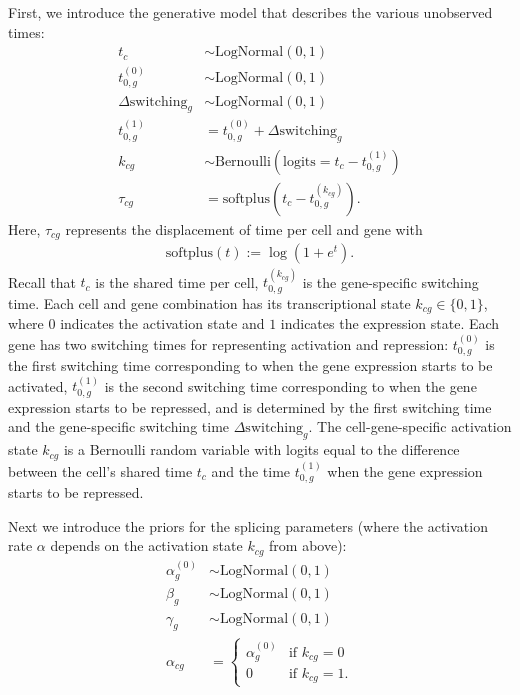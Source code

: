 \documentclass[
  sn-mathphys-num,
  lineno,
  twocolumn]{sn-jnl}
\begin{document}
First, we introduce the generative model that describes the various
unobserved times: \begin{align}
  t_c &\sim \text{LogNormal}(0, 1) \\
  t^{(0)}_{0,g} &\sim \text{LogNormal}(0, 1) \\
  \Delta \textrm{switching}_g &\sim \text{LogNormal}(0, 1) \\
  t^{(1)}_{0,g} &= t^{(0)}_{0,g} + \Delta \textrm{switching}_g \\
  k_{cg} &\sim \text{Bernoulli}(\textrm{logits}=t_c - t^{(1)}_{0,g}) \\
  \tau_{cg} &= \text{softplus}(t_c - t^{(k_{cg})}_{0,g}).
\end{align} Here, \(\tau_{cg}\) represents the displacement of time per
cell and gene with \begin{align}
 \text{softplus}(t) :=  \log( 1 + e^t).
\end{align} Recall that \(t_c\) is the shared time per cell,
\(t^{(k_{cg})}_{0,g}\) is the gene-specific switching time. Each cell
and gene combination has its transcriptional state
\(k_{cg} \in \{ 0, 1 \}\), where \(0\) indicates the activation state
and \(1\) indicates the expression state. Each gene has two switching
times for representing activation and repression: \(t^{(0)}_{0,g}\) is
the first switching time corresponding to when the gene expression
starts to be activated, \(t^{(1)}_{0,g}\) is the second switching time
corresponding to when the gene expression starts to be repressed, and is
determined by the first switching time and the gene-specific switching
time \(\Delta \text{switching}_g\). The cell-gene-specific activation
state \(k_{cg}\) is a Bernoulli random variable with logits equal to the
difference between the cell's shared time \(t_c\) and the time
\(t^{(1)}_{0,g}\) when the gene expression starts to be repressed.

Next we introduce the priors for the splicing parameters (where the
activation rate \(\alpha\) depends on the activation state \(k_{cg}\)
from above): \begin{align*}
  \alpha^{(0)}_g &\sim \text{LogNormal}(0, 1) \\
  \beta_g &\sim \text{LogNormal}(0, 1) \\
  \gamma_g &\sim \text{LogNormal}(0, 1) \\
  \alpha_{cg} &= \begin{cases}
    \alpha^{(0)}_g & \text{if } k_{cg} = 0 \\
    0 & \text{if } k_{cg} = 1.
  \end{cases}
\end{align*}
\end{document}
